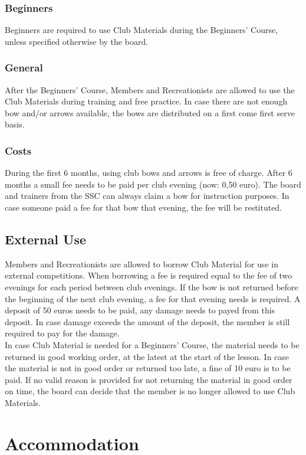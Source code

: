 \documentclass[a4paper]{article}
\begin{document}
\subsubsection{Beginners}
Beginners are required to use Club Materials during the Beginners' Course, unless specified otherwise by the board.

\subsubsection{General}
After the Beginners' Course, Members and Recreationists are allowed to use the Club Materials during training and free practice. In case there are not enough bow and/or arrows available, the bows are distributed on a first come first serve basis.

\subsubsection{Costs}
During the first 6 months, using club bows and arrows is free of charge. After 6 months a small fee needs to be paid per club evening (now: 0,50 euro). The board and trainers from the SSC can always claim a bow for instruction purposes. In case someone paid a fee for that bow that evening, the fee will be restituted.

\subsection{External Use}
Members and Recreationists are allowed to borrow Club Material for use in external competitions. When borrowing a fee is required equal to the fee of two evenings for each period between club evenings. If the bow is not returned before the beginning of the next club evening, a fee for that evening needs is required. A deposit of 50 euros needs to be paid, any damage needs to payed from this deposit. In case damage exceeds the amount of the deposit, the member is still required to pay for the damage. \\

In case Club Material is needed for a Beginners' Course, the material needs to be returned in good working order, at the latest at the start of the lesson. In case the material is not in good order or returned too late, a fine of 10 euro is to be paid. If no valid reason is provided for not returning the material in good order on time, the board can decide that the member is no longer allowed to use Club Materials.

\section{Accommodation}
\end{document}
